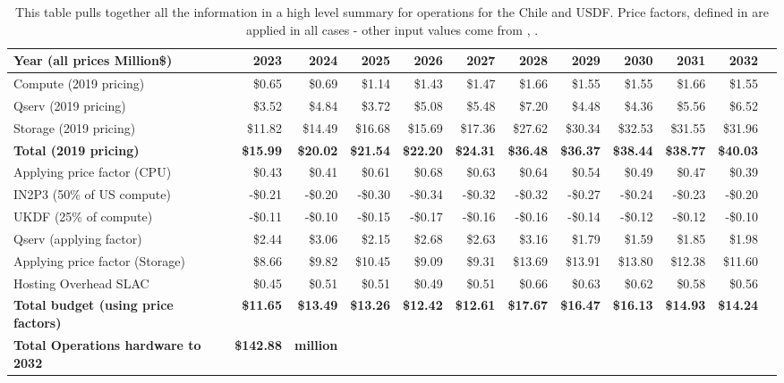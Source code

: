 \tiny \begin{longtable} { |p{}  |r  |r  |r  |r  |r  |r  |r  |r  |r  |r  |r |} 
\caption{This table pulls together all the information in a high level summary for operations  for the Chile and USDF. Price factors, defined in  are applied in all cases - other input values come from , .
 \label{tab:opsSummary}}\\ 
\hline 
\textbf{Year  (all prices Million\$)}&\textbf{2023}&\textbf{2024}&\textbf{2025}&\textbf{2026}&\textbf{2027}&\textbf{2028}&\textbf{2029}&\textbf{2030}&\textbf{2031}&\textbf{2032} \\ \hline
{Compute (2019 pricing)}&{\$0.65}&{\$0.69}&{\$1.14}&{\$1.43}&{\$1.47}&{\$1.66}&{\$1.55}&{\$1.55}&{\$1.66}&{\$1.55} \\ \hline
{Qserv (2019 pricing)}&{\$3.52}&{\$4.84}&{\$3.72}&{\$5.08}&{\$5.48}&{\$7.20}&{\$4.48}&{\$4.36}&{\$5.56}&{\$6.52} \\ \hline
{Storage (2019 pricing)}&{\$11.82}&{\$14.49}&{\$16.68}&{\$15.69}&{\$17.36}&{\$27.62}&{\$30.34}&{\$32.53}&{\$31.55}&{\$31.96} \\ \hline
\textbf{Total (2019 pricing)}&\textbf{\$15.99}&\textbf{\$20.02}&\textbf{\$21.54}&\textbf{\$22.20}&\textbf{\$24.31}&\textbf{\$36.48}&\textbf{\$36.37}&\textbf{\$38.44}&\textbf{\$38.77}&\textbf{\$40.03} \\ \hline
{Applying price factor (CPU)}&{\$0.43}&{\$0.41}&{\$0.61}&{\$0.68}&{\$0.63}&{\$0.64}&{\$0.54}&{\$0.49}&{\$0.47}&{\$0.39} \\ \hline
{IN2P3 (50\% of US compute)}&{-\$0.21}&{-\$0.20}&{-\$0.30}&{-\$0.34}&{-\$0.32}&{-\$0.32}&{-\$0.27}&{-\$0.24}&{-\$0.23}&{-\$0.20} \\ \hline
{UKDF (25\% of compute)}&{-\$0.11}&{-\$0.10}&{-\$0.15}&{-\$0.17}&{-\$0.16}&{-\$0.16}&{-\$0.14}&{-\$0.12}&{-\$0.12}&{-\$0.10} \\ \hline
{Qserv (applying factor)}&{\$2.44}&{\$3.06}&{\$2.15}&{\$2.68}&{\$2.63}&{\$3.16}&{\$1.79}&{\$1.59}&{\$1.85}&{\$1.98} \\ \hline
{Applying price factor (Storage)}&{\$8.66}&{\$9.82}&{\$10.45}&{\$9.09}&{\$9.31}&{\$13.69}&{\$13.91}&{\$13.80}&{\$12.38}&{\$11.60} \\ \hline
{Hosting Overhead SLAC}&{\$0.45}&{\$0.51}&{\$0.51}&{\$0.49}&{\$0.51}&{\$0.66}&{\$0.63}&{\$0.62}&{\$0.58}&{\$0.56} \\ \hline
\textbf{Total budget (using price factors)}&\textbf{\$11.65}&\textbf{\$13.49}&\textbf{\$13.26}&\textbf{\$12.42}&\textbf{\$12.61}&\textbf{\$17.67}&\textbf{\$16.47}&\textbf{\$16.13}&\textbf{\$14.93}&\textbf{\$14.24} \\ \hline
\textbf{Total Operations hardware to 2032 }&\textbf{\$142.88}&\textbf{million}&&&&&&&& \\ \hline
\end{longtable} \normalsize
